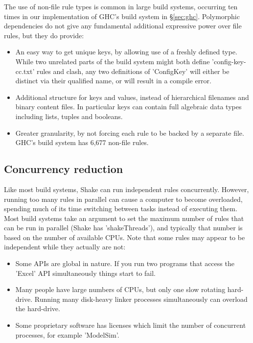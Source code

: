 The use of non-file rule types is common in large build systems, occurring ten
times in our implementation of GHC's build system in \S\ref{sec:ghc}.
Polymorphic dependencies do not give any fundamental additional expressive power
over file rules, but they do provide:

\begin{itemize}
\item An easy way to get unique keys, by allowing use of a freshly defined type.
While two unrelated parts of the build system might both define
\lst'config-key-cc.txt' rules and clash, any two definitions of \lst'ConfigKey'
will either be distinct via their qualified name, or will result in a compile
error.
\item Additional structure for keys and values, instead of hierarchical
filenames and binary content files. In particular keys can contain full
algebraic data types including lists, tuples and booleans.
\item Greater granularity, by not forcing each rule to be backed by a separate
file. GHC's build system has 6,677 non-file rules.
\end{itemize}

\subsection{Concurrency reduction\label{sec:concurrency-reduction}}

Like most build systems, Shake can run independent rules concurrently.
However, running too many rules in parallel can cause a computer to become overloaded,
spending much of its time switching between tasks instead of executing them.
Most build systems take an argument to set the maximum number of rules that can
be run in parallel (Shake has \lst'shakeThreads'), and typically that number
is based on the number of available CPUs. Note that some rules may appear to be
independent while they actually are not:


\begin{itemize}
\item Some APIs are global in nature. If you run two programs that access the
\lst'Excel' API simultaneously things start to fail.
\item Many people have large numbers of CPUs, but only one slow rotating
hard-drive. Running many disk-heavy linker processes simultaneously can overload
the hard-drive.
\item Some proprietary software has licenses which limit the number of
concurrent processes, for example \lst'ModelSim'.
\end{itemize}

